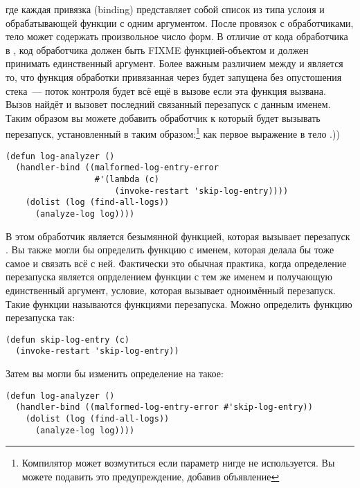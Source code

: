 \noindent{}где каждая привязка (binding) представляет собой список из типа услоия и обрабатывающей
функции с одним аргументом. После провязок с обработчиками, тело  может
содержать произвольное число форм. В отличие от кода обработчика в ,
код обработчика должен быть FIXME функцией-объектом и должен принимать единственный
аргумент. Более важным различием между  и  является
то, что функция обработки привязанная через  будет запущена без
опустошения стека~--- поток контроля будет всё ещё в вызове  если
эта функция вызвана. Вызов  найдёт и вызовет последний связанный
перезапуск с данным именем. Таким образом вы можете добавить обработчик к
 который будет вызывать  перезапуск, установленный
в  таким образом:\footnote{Компилятор может возмутиться если параметр
    нигде не используется. Вы можете подавить это предупреждение, добавив объявление
    } как первое выражение в тело .))

\begin{lstlisting}
(defun log-analyzer ()
  (handler-bind ((malformed-log-entry-error
                  #'(lambda (c)
                      (invoke-restart 'skip-log-entry))))
    (dolist (log (find-all-logs))
      (analyze-log log))))
\end{lstlisting}

В этом  обработчик является безымянной функцией, которая вызывает
перезапуск . Вы также могли бы определить функцию с именем, которая
делала бы тоже самое и связать всё с ней. Фактически это обычная практика, когда
определение перезапуска является опрделением функции с тем же именем и получающую
единственный аргумент, условие, которая вызывает одноимённый перезапуск. Такие функции
называются функциями перезапуска. Можно определить функцию перезапуска
 так:

\begin{lstlisting}
(defun skip-log-entry (c)
  (invoke-restart 'skip-log-entry))
\end{lstlisting}

Затем вы могли бы изменить определение  на такое:

\begin{lstlisting}
(defun log-analyzer ()
  (handler-bind ((malformed-log-entry-error #'skip-log-entry))
    (dolist (log (find-all-logs))
      (analyze-log log))))
\end{lstlisting}

